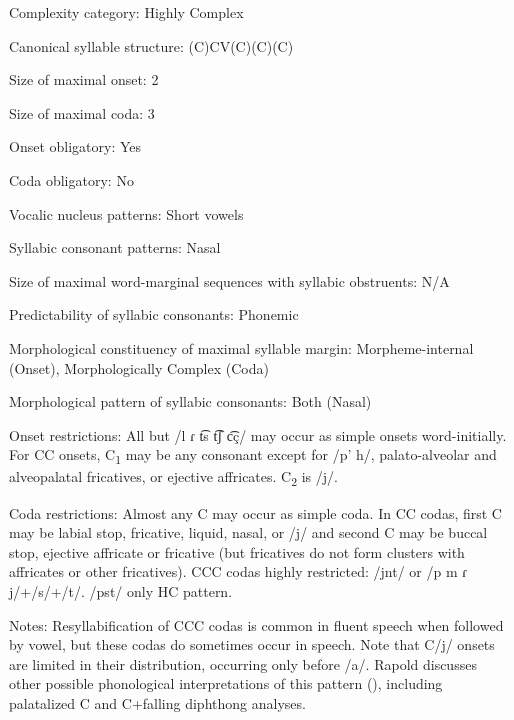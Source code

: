 {\begin{appendixdesc}
\item[Complexity category:] Highly Complex

\item[Canonical syllable structure:] (C)CV(C)(C)(C) \citep[91--112]{Rapold2006}

\item[Size of maximal onset:] 2

\item[Size of maximal coda:] 3

\item[Onset obligatory:] Yes

\item[Coda obligatory:] No

\item[Vocalic nucleus patterns:] Short vowels

\item[Syllabic consonant patterns:] Nasal

\item[Size of maximal word-marginal sequences with syllabic obstruents:] N/A

\item[Predictability of syllabic consonants:] Phonemic

\item[Morphological constituency of maximal syllable margin:] Morpheme-internal (Onset), Morphologically Complex (Coda)

\item[Morphological pattern of syllabic consonants:] Both (Nasal)

\item[Onset restrictions:] All but /l ɾ t͡s t͡ʃ c͡ç/ may occur as simple onsets word-initially. For CC onsets, C\textsubscript{1} may be any consonant except for /p’ h/, palato-alveolar and alveopalatal fricatives, or ejective affricates. C\textsubscript{2} is /j/.

\item[Coda restrictions:] Almost any C may occur as simple coda. In CC codas, first C may be labial stop, fricative, liquid, nasal, or /j/ and second C may be buccal stop, ejective affricate or fricative (but fricatives do not form clusters with affricates or other fricatives). CCC codas highly restricted: /jnt/ or /p m ɾ j/+/s/+/t/. /pst/ only HC pattern.

\item[Notes:] Resyllabification of CCC codas is common in fluent speech when followed by vowel, but these codas do sometimes occur in speech. Note that C/j/ onsets are limited in their distribution, occurring only before /a/. Rapold discusses other possible phonological interpretations of this pattern (\citeyear[101--103]{Rapold2006}), including palatalized C and C+falling diphthong analyses.
\end{appendixdesc}
}
